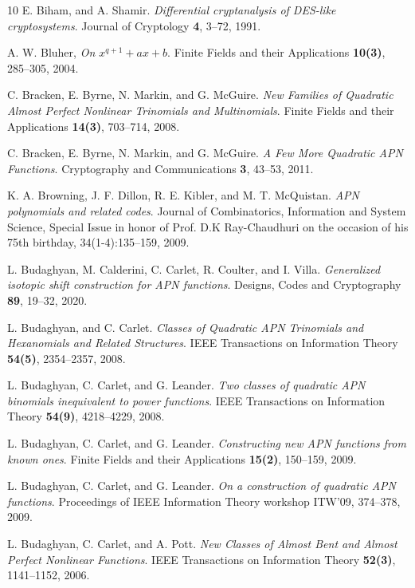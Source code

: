 \documentclass{article}
\begin{document}
\begin{thebibliography}{10}
 E. Biham, and A. Shamir. \textit{Differential cryptanalysis of DES-like cryptosystems}. {Journal of Cryptology} \textbf{4}, 3--72, 1991.

 A. W. Bluher, \textit{On $x^{q+1} + ax + b$}. Finite Fields and their Applications \textbf{10(3)}, 285--305, 2004.

 C. Bracken, E. Byrne, N. Markin, and G. McGuire. \textit{New Families of Quadratic Almost Perfect Nonlinear Trinomials and Multinomials}. {Finite Fields and their Applications} \textbf{14(3)}, 703--714, 2008.

 C. Bracken, E. Byrne, N. Markin, and G. McGuire. \textit{A Few More Quadratic APN Functions}. {Cryptography and Communications} \textbf{3}, 43--53, 2011.

 K. A. Browning, J. F. Dillon, R. E. Kibler, and M. T. McQuistan. \textit{APN polynomials and related codes}. Journal of Combinatorics, Information and System Science, Special Issue in honor of Prof. D.K Ray-Chaudhuri on the occasion of his 75th birthday, 34(1-4):135--159, 2009.


 L. Budaghyan, M. Calderini, C. Carlet, R. Coulter, and I. Villa. \textit{Generalized isotopic shift construction for APN functions}. {Designs, Codes
and Cryptography} \textbf{89}, 19--32, 2020.

 L. Budaghyan, and C. Carlet. \textit{Classes of Quadratic APN Trinomials and Hexanomials and Related Structures}. {IEEE Transactions on Information Theory} \textbf{54(5)}, 2354--2357, 2008.

 L. Budaghyan, C. Carlet, and G. Leander. \textit{Two classes of quadratic APN binomials inequivalent to power functions}. {IEEE Transactions on Information Theory} \textbf{54(9)}, 4218--4229, 2008.

 L. Budaghyan, C. Carlet, and G. Leander. \textit{Constructing new APN functions from known ones}. {Finite Fields and their Applications} \textbf{15(2)}, 150--159, 2009.

 L. Budaghyan, C. Carlet, and G. Leander. \textit{On a construction of quadratic APN functions}. {Proceedings of IEEE Information Theory workshop ITW'09}, 374--378,  2009.

 L. Budaghyan, C. Carlet, and A. Pott. \textit{New Classes of Almost Bent and Almost Perfect
Nonlinear Functions}. IEEE Transactions on Information Theory \textbf{52(3)}, 1141--1152, 2006.


\end{thebibliography}
\end{document}
